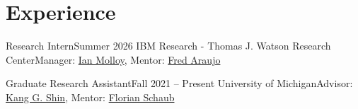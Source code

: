 \section{Experience}
  \CVSubHeadingListStart


    \CVSubheading
      {Research Intern}{Summer 2026}
      {IBM Research - Thomas J. Watson Research Center}{Manager: \href{https://research.ibm.com/people/ian-molloy}{Ian Molloy}, Mentor: \href{https://research.ibm.com/people/frederico-araujo}{Fred Araujo}}
      \CVItemListStart
      \CVItemListEnd

    \CVSubheading
      {Graduate Research Assistant}{Fall 2021 -- Present}
      {University of Michigan}{Advisor: \href{https://web.eecs.umich.edu/~kgshin/}{Kang G. Shin}, Mentor: \href{https://www.si.umich.edu/people/florian-schaub}{Florian Schaub}}
      
